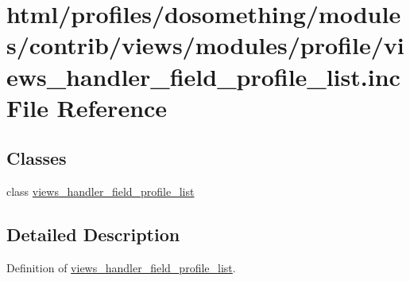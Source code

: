\hypertarget{views__handler__field__profile__list_8inc}{
\section{html/profiles/dosomething/modules/contrib/views/modules/profile/views\_\-handler\_\-field\_\-profile\_\-list.inc File Reference}
\label{views__handler__field__profile__list_8inc}
}
\subsection*{Classes}
\begin{DoxyCompactItemize}
\item 
class \hyperlink{classviews__handler__field__profile__list}{views\_\-handler\_\-field\_\-profile\_\-list}
\end{DoxyCompactItemize}


\subsection{Detailed Description}
Definition of \hyperlink{classviews__handler__field__profile__list}{views\_\-handler\_\-field\_\-profile\_\-list}. 
